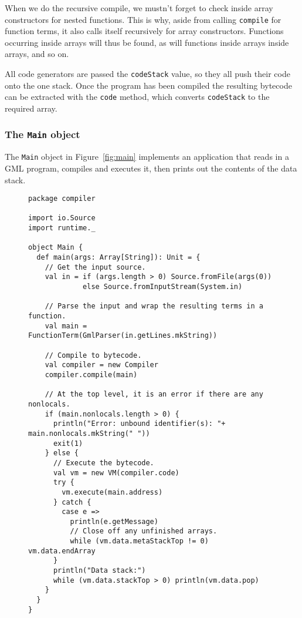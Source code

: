 When we do the recursive compile,
we mustn't forget to check inside array constructors for nested functions.
This is why, aside from calling \verb!compile! for function terms,
it also calls itself recursively for array constructors.
Functions occurring inside arrays will thus be found,
as will functions inside arrays inside arrays, and so on.

All code generators are passed the \verb!codeStack! value,
so they all push their code onto the one stack.
Once the program has been compiled
the resulting bytecode can be extracted with the \verb!code! method,
which converts \verb!codeStack! to the required array.


\subsubsection{The \texttt{Main} object\label{sec:main}}

The \verb!Main! object in Figure~\ref{fig:main} implements an application
that reads in a GML program, compiles and executes it,
then prints out the contents of the data stack.

\begin{figure}
\begin{verbatim}
package compiler

import io.Source
import runtime._

object Main {
  def main(args: Array[String]): Unit = {
    // Get the input source.
    val in = if (args.length > 0) Source.fromFile(args(0))
             else Source.fromInputStream(System.in)

    // Parse the input and wrap the resulting terms in a function.
    val main = FunctionTerm(GmlParser(in.getLines.mkString))

    // Compile to bytecode.
    val compiler = new Compiler
    compiler.compile(main)

    // At the top level, it is an error if there are any nonlocals.
    if (main.nonlocals.length > 0) {
      println("Error: unbound identifier(s): "+ main.nonlocals.mkString(" "))
      exit(1)
    } else {
      // Execute the bytecode.
      val vm = new VM(compiler.code)
      try {
        vm.execute(main.address)
      } catch {
        case e =>
          println(e.getMessage)
          // Close off any unfinished arrays.
          while (vm.data.metaStackTop != 0) vm.data.endArray
      }
      println("Data stack:")
      while (vm.data.stackTop > 0) println(vm.data.pop)
    }
  }
}
\end{verbatim}
\getcaption
\end{figure}

